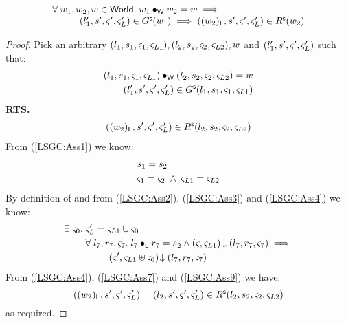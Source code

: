 \begin{lemma}[]\label{lem:shiftGContainment}
%
\[
\begin{array}{l}
	\forall\; w_1, w_2, w \in \textsf{World}.\; w_1 \bullet_{\textsf{W}} w_2 = w \implies\\
	\hspace*{1cm}(l'_1, s', \varsigma_{}', \varsigma_{L}') \in G^{\textsf{s}}(w_1) \implies ((w_2)_{\textsf{L}}, s', \varsigma_{}', \varsigma_{L}') \in R^{\textsf{s}}(w_2)
\end{array}
\]
%
\begin{proof} Pick an arbitrary $(l_1, s_1, \varsigma_{1}, \varsigma_{L1}), (l_2, s_2, \varsigma_{2}, \varsigma_{L2}), w$ and $(l'_1, s', \varsigma_{}', \varsigma_{L}')$ such that:
%
\begin{align}
	(l_1, s_1, \varsigma_{1}, \varsigma_{L1}) \bullet_{\textsf{W}} (l_2, s_2, \varsigma_{2}, \varsigma_{L2}) = w \label{LSGC:Ass1}\\
	(l'_1, s', \varsigma_{}', \varsigma_{L}') \in G^{\textsf{s}}(l_1, s_1, \varsigma_{1}, \varsigma_{L1}) \label{LSGC:Ass2}
\end{align}
%
\textbf{RTS.}
%
\begin{align}
	((w_2)_{\textsf{L}}, s', \varsigma_{}', \varsigma_{L}') \in R^{\textsf{s}}(l_2, s_2, \varsigma_{2}, \varsigma_{L2}) \label{LSGC:Goal}
\end{align}
From (\ref{LSGC:Ass1}) we know:
%
\begin{align}
	& s_1 = s_2 \label{LSGC:Ass3}\\
	& \varsigma_{1} = \varsigma_{2} \;\land\; \varsigma_{L1} = \varsigma_{L2} \label{LSGC:Ass4}
\end{align}
%
By definition of \shiftG and from (\ref{LSGC:Ass2}), (\ref{LSGC:Ass3}) and (\ref{LSGC:Ass4}) we know:
%
\begin{align}
%
	\exsts{\amod{0}} & \amod{L}' = \amod{L1} \cup \amod{0} \label{LSGC:Ass7}\\
%	
	&\for{l_7, r_7, \amod{7}} l_7 \composeL r_7 = s_2 \land \extendsAM{\amod{}, \amod{L1}}{l_7}{r_7}{\amod{7}} \implies \nonumber\\ 
	&\hspace*{0.8cm}\extendsAM{\amod{}', \amod{L1} \uplus \amod{0}}{l_7}{r_7}{\amod{7}}  \label{LSGC:Ass9}
%
\end{align}
%
From (\ref{LSGC:Ass4}), (\ref{LSGC:Ass7}) and (\ref{LSGC:Ass9}) we have:
%
\begin{equation}
	((w_2)_{\textsf{L}}, s', \varsigma_{}', \varsigma_{L}') = (l_2, s', \varsigma_{}', \varsigma_{L}') \in R^{\textsf{s}}(l_2, s_2, \varsigma_{2}, \varsigma_{L2}) \nonumber
\end{equation}
% 
as required.
\end{proof}
%
%
\end{lemma}
